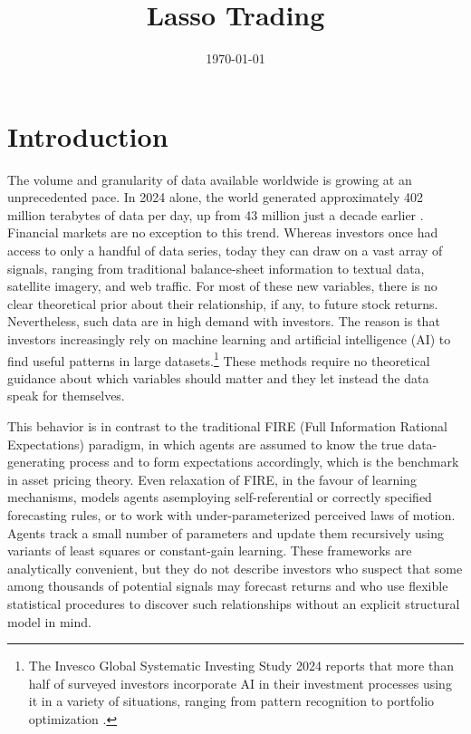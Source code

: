 \documentclass[11pt]{article}
\title{Lasso Trading}
\author{}
\date{\today}
\begin{document}

{
\maketitle
\centering
}

\section{Introduction}

The volume and granularity of data available worldwide is growing at an unprecedented pace.
In 2024 alone, the world generated approximately 402 million terabytes of data per day, up from 43 million just a decade earlier \citep{DataSphere2025}. 
Financial markets are no exception to this trend.
Whereas investors once had access to only a handful of data series, today they can draw on a vast array of signals, ranging from traditional balance-sheet information to textual data, satellite imagery, and web traffic.
For most of these new variables, there is no clear theoretical prior about their relationship, if any, to future stock returns. 
Nevertheless, such data are in high demand with investors. 
The reason is that investors increasingly rely on machine learning and artificial intelligence (AI) to find useful patterns in large datasets.\footnote{The Invesco Global Systematic Investing Study 2024 reports that more than half of surveyed investors incorporate AI in their investment processes using it in a variety of situations, ranging from pattern recognition to portfolio optimization \citep{Invesco2024IGSIS}.}
These methods require no theoretical guidance about which variables should matter and they let instead the data speak for themselves.

This behavior is in contrast to the traditional FIRE (Full Information Rational Expectations) paradigm, in which agents are assumed to know the true data-generating process and to form expectations accordingly, which is
the benchmark in asset pricing theory. 
Even relaxation of FIRE, in the favour of learning mechanisms, models agents asemploying self-referential or correctly specified forecasting rules, or to work with under-parameterized perceived laws of motion. Agents track a small number of parameters and update them recursively using variants of least squares or constant-gain learning. 
These frameworks are analytically convenient, but they do not describe investors who suspect that some among thousands of potential signals may forecast returns and who use flexible statistical procedures to discover such relationships without an explicit structural model in mind.
\end{document}
